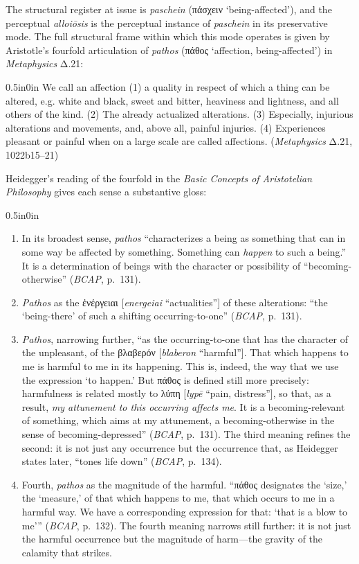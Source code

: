 \documentclass{article}
\newcommand{\gk}[1]{{\greekfont #1}}
\begin{document}
The structural register at issue is \textit{paschein} (\gk{πάσχειν} `being-affected'), and the perceptual \textit{alloiōsis} is the perceptual instance of \textit{paschein} in its preservative mode. The full structural frame within which this mode operates is given by Aristotle's fourfold articulation of \textit{pathos} (\gk{πάθος} `affection, being-affected') in \textit{Metaphysics} Δ.21:
\begin{adjustwidth}{0.5in}{0in}
We call an affection (1) a quality in respect of which a thing can be altered, e.g. white and black, sweet and bitter, heaviness and lightness, and all others of the kind. (2) The already actualized alterations. (3) Especially, injurious alterations and movements, and, above all, painful injuries. (4) Experiences pleasant or painful when on a large scale are called affections. (\textit{Metaphysics} Δ.21, 1022b15--21)
\end{adjustwidth}
Heidegger's reading of the fourfold in the \textit{Basic Concepts of Aristotelian Philosophy} gives each sense a substantive gloss:
\begin{adjustwidth}{0.5in}{0in}
    \begin{enumerate}
        \item In its broadest sense, \textit{pathos} ``characterizes a being as something that can in some way be affected by something. Something can \textit{happen} to such a being.'' It is a determination of beings with the character or possibility of ``becoming-otherwise'' (\textit{BCAP}, p.~131).
        \item \textit{Pathos} as the \gk{ἐνέργειαι} [\textit{energeiai} ``actualities''] of these alterations: ``the `being-there' of such a shifting occurring-to-one'' (\textit{BCAP}, p.~131).
        \item \textit{Pathos}, narrowing further, ``as the occurring-to-one that has the character of the unpleasant, of the \gk{βλαβερόν} [\textit{blaberon} ``harmful'']. That which happens to me is harmful to me in its happening. This is, indeed, the way that we use the expression `to happen.' But \gk{πάθος} is defined still more precisely: harmfulness is related mostly to \gk{λύπη} [\textit{lypē} ``pain, distress''], so that, as a result, \textit{my attunement to this occurring affects me}. It is a becoming-relevant of something, which aims at my attunement, a becoming-otherwise in the sense of becoming-depressed'' (\textit{BCAP}, p.~131). The third meaning refines the second: it is not just any occurrence but the occurrence that, as Heidegger states later, ``tones life down'' (\textit{BCAP}, p.~134).
        \item Fourth, \textit{pathos} as the magnitude of the harmful. ``\gk{πάθος} designates the `size,' the `measure,' of that which happens to me, that which occurs to me in a harmful way. We have a corresponding expression for that: `that is a blow to me''' (\textit{BCAP}, p.~132). The fourth meaning narrows still further: it is not just the harmful occurrence but the magnitude of harm---the gravity of the calamity that strikes.
    \end{enumerate}
\end{adjustwidth}
\end{document}
